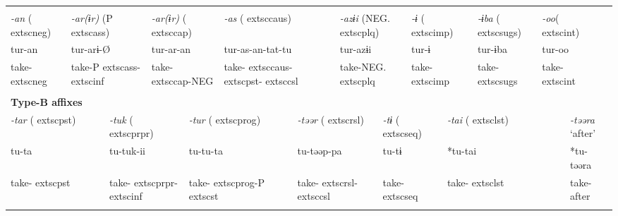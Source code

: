 \tabletail{}
\tablelasttail{}
\begin{tabularx}{\textwidth}{XXXXXXXXXXXXXXXXXXXXXXX}
\lsptoprule
\multicolumn{23}{X}{{\bfseries Type-A affixes}}\\
{ \textit{{}-an} (	extsc{neg})} & \multicolumn{4}{X}{{ \textit{{}-ar(ɨr)} (P	extsc{ass})}} & \multicolumn{4}{X}{{ \textit{{}-ar(ɨr)} (	extsc{cap})}} & \multicolumn{4}{X}{{ \textit{{}-as} (	extsc{caus})}} & \multicolumn{4}{X}{{ \textit{{}-azɨi} (NEG.	extsc{plq})}} & \multicolumn{2}{X}{{ \textit{{}-ɨ} (	extsc{imp})}} & { \textit{{}-ɨba} (	extsc{sugs})} & \multicolumn{2}{X}{{ \textit{{}-oo}(	extsc{int})}} & \\
{ tur-an} & \multicolumn{4}{X}{{ tur-arɨ-Ø}} & \multicolumn{4}{X}{{ tur-ar-an}} & \multicolumn{4}{X}{{ tur-as-an-tat-tu}} & \multicolumn{4}{X}{{ tur-azɨi}} & \multicolumn{2}{X}{{ tur-ɨ}} & { tur-ɨba} & \multicolumn{2}{X}{{ tur-oo}} & \\
take-	extsc{neg} & \multicolumn{4}{X}{take-P	extsc{ass}-	extsc{inf}} & \multicolumn{4}{X}{take-	extsc{cap}-NEG} & \multicolumn{4}{X}{take-	extsc{caus}-	extsc{pst}-	extsc{csl}} & \multicolumn{4}{X}{take-NEG.	extsc{plq}} & \multicolumn{2}{X}{take-	extsc{imp}} & take-	extsc{sugs} & \multicolumn{2}{X}{take-	extsc{int}} & \\
\multicolumn{23}{X}{}\\
\multicolumn{23}{X}{{\bfseries Type-B affixes}}\\
\multicolumn{3}{X}{{ \textit{{}-tar} (	extsc{pst})}} & \multicolumn{5}{X}{{ \textit{{}-tuk} (	extsc{prpr})}} & \multicolumn{3}{X}{{ \textit{{}-tur} (	extsc{prog})}} & \multicolumn{4}{X}{{ \textit{{}-təər} (	extsc{rsl})}} & \multicolumn{3}{X}{{ \textit{{}-tɨ} (	extsc{seq})}} & \multicolumn{3}{X}{{ \textit{{}-tai} (	extsc{lst})}} & \multicolumn{2}{X}{{ \textit{{}-təəra} ‘after’}}\\
\multicolumn{3}{X}{{ tu-ta}} & \multicolumn{5}{X}{{ tu-tuk-ii}} & \multicolumn{3}{X}{{ tu-tu-ta}} & \multicolumn{4}{X}{{ tu-təəp-pa}} & \multicolumn{3}{X}{{ tu-tɨ}} & \multicolumn{3}{X}{{ *tu-tai}} & \multicolumn{2}{X}{{ *tu-təəra}}\\
\multicolumn{3}{X}{take-	extsc{pst}} & \multicolumn{5}{X}{take-	extsc{prpr}-	extsc{inf}} & \multicolumn{3}{X}{take-	extsc{prog}-P	extsc{st}} & \multicolumn{4}{X}{take-	extsc{rsl}-	extsc{csl}} & \multicolumn{3}{X}{take-	extsc{seq}} & \multicolumn{3}{X}{take-	extsc{lst}} & \multicolumn{2}{X}{{ take-after}}\\
\multicolumn{3}{X}{} & \multicolumn{5}{X}{} & \multicolumn{3}{X}{} & \multicolumn{4}{X}{} & \multicolumn{3}{X}{} & \multicolumn{3}{X}{} & \multicolumn{2}{X}{}\\

\end{tabularx}
